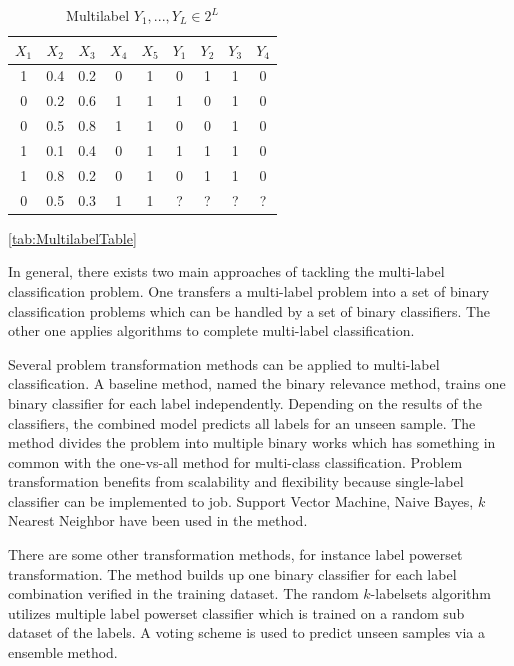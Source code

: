 \begin{table}
\centering
\begin{tabular}{|c c c c c | c c c c|}
\hline
$X_{1}$ & $X_{2}$ &  $X_{3}$ & $X_{4}$ & $X_{5}$ & $Y_{1}$ & $Y_{2}$ & $Y_{3}$ & $Y_{4}$ \\
\hline
1 & 0.4 & 0.2 & 0 & 1 & 0 & 1 & 1 & 0 \\
0 & 0.2 & 0.6 & 1 & 1 & 1 & 0 & 1 & 0 \\
0 & 0.5 & 0.8 & 1 & 1 & 0 & 0 & 1 & 0 \\
1 & 0.1 & 0.4 & 0 & 1 & 1 & 1 & 1 & 0 \\
1 & 0.8 & 0.2 & 0 & 1 & 0 & 1 & 1 & 0 \\
\hline
0 & 0.5 & 0.3 & 1 & 1 & ? & ? & ? & ? \\
\hline
\end{tabular}
\caption{Multilabel $Y_{1},...,Y_{L} \in 2^L$}
\ref{tab:MultilabelTable}
\end{table}

In general, there exists two main approaches of tackling the multi-label classification problem. One transfers a multi-label problem into a set of binary classification problems which can be handled by a set of binary classifiers. The other one applies algorithms to complete multi-label classification. 

Several problem transformation methods can be applied to multi-label classification. A baseline method, named the binary relevance method\citep{read2011classifier}, trains one binary classifier for each label independently. Depending on the results of the classifiers, the combined model predicts all labels for an unseen sample. The method divides the problem into multiple binary works which has something in common with the one-vs-all method for multi-class classification. Problem transformation benefits from scalability and flexibility because single-label classifier can be implemented to job. Support Vector Machine, Naive Bayes, $k$ Nearest Neighbor have been used in the method\citep{read2011classifier}.

There are some other transformation methods, for instance label powerset transformation. The method builds up one binary classifier for each label combination verified in the training dataset\citep{tsoumakas2006multi}. The random $k$-labelsets algorithm\citep{tsoumakas2007random} utilizes multiple label powerset classifier which is trained on a random sub dataset of the labels. A voting scheme is used to predict unseen samples via a ensemble method.


